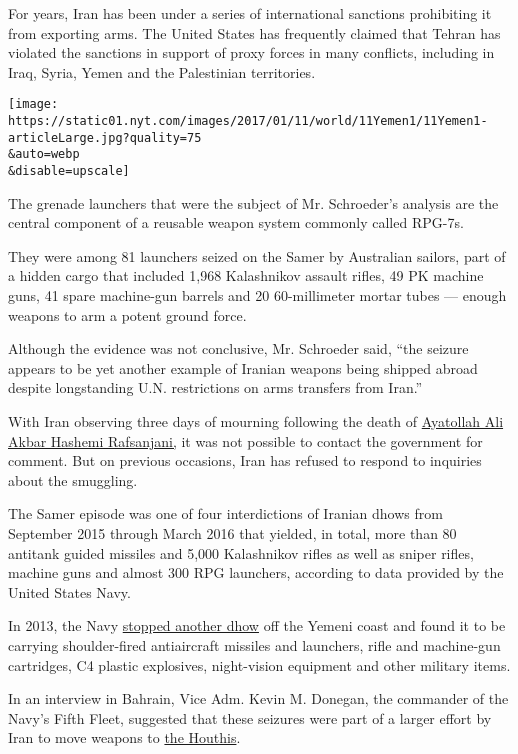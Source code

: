 For years, Iran has been under a series of international sanctions
prohibiting it from exporting arms. The United States has frequently
claimed that Tehran has violated the sanctions in support of proxy
forces in many conflicts, including in Iraq, Syria, Yemen and the
Palestinian territories.

\texttt{[image: https://static01.nyt.com/images/2017/01/11/world/11Yemen1/11Yemen1-articleLarge.jpg?quality=75\\\&auto=webp\\\&disable=upscale]}

The grenade launchers that were the subject of Mr. Schroeder's analysis
are the central component of a reusable weapon system commonly called
RPG-7s.

They were among 81 launchers seized on the Samer by Australian sailors,
part of a hidden cargo that included 1,968 Kalashnikov assault rifles,
49 PK machine guns, 41 spare machine-gun barrels and 20 60-millimeter
mortar tubes --- enough weapons to arm a potent ground force.

Although the evidence was not conclusive, Mr. Schroeder said, ``the
seizure appears to be yet another example of Iranian weapons being
shipped abroad despite longstanding U.N. restrictions on arms transfers
from Iran.''

With Iran observing three days of mourning following the death of
\href{https://www.nytimes.com/2017/01/10/world/middleeast/iran-rafsanjani-funeral-protests.html?ref=world}{Ayatollah
Ali Akbar Hashemi Rafsanjani,} it was not possible to contact the
government for comment. But on previous occasions, Iran has refused to
respond to inquiries about the smuggling.

The Samer episode was one of four interdictions of Iranian dhows from
September 2015 through March 2016 that yielded, in total, more than 80
antitank guided missiles and 5,000 Kalashnikov rifles as well as sniper
rifles, machine guns and almost 300 RPG launchers, according to data
provided by the United States Navy.

In 2013, the Navy
\href{http://www.nytimes.com/2013/03/03/world/middleeast/seized-arms-off-yemen-raise-alarm-over-iran.html}{stopped
another dhow} off the Yemeni coast and found it to be carrying
shoulder-fired antiaircraft missiles and launchers, rifle and
machine-gun cartridges, C4 plastic explosives, night-vision equipment
and other military items.

In an interview in Bahrain, Vice Adm. Kevin M. Donegan, the commander of
the Navy's Fifth Fleet, suggested that these seizures were part of a
larger effort by Iran to move weapons to
\href{https://www.nytimes.com/2016/11/26/world/middleeast/houthi-rebels-yemen.html?rref=collection\%2Ftimestopic\%2FYemen\&action=click\&contentCollection=world\&region=stream\&module=stream_unit\&version=latest\&contentPlacement=10\&pgtype=collection}{the
Houthis}.

